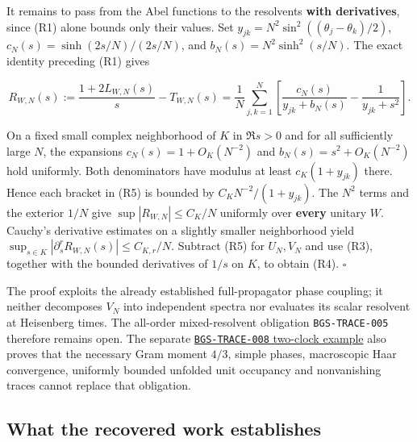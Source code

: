 It remains to pass from the Abel functions to the resolvents \textbf{with
derivatives}, since (R1) alone bounds only their values. Set
\(y_{jk}=N^2\sin^2((\theta_j-\theta_k)/2)\),
\(c_N(s)=\sinh(2s/N)/(2s/N)\), and
\(b_N(s)=N^2\sinh^2(s/N)\). The exact identity preceding (R1) gives

\[
R_{W,N}(s):=\frac{1+2L_{W,N}(s)}s-T_{W,N}(s)
=\frac1N\sum_{j,k=1}^N\left[
 \frac{c_N(s)}{y_{jk}+b_N(s)}-\frac1{y_{jk}+s^2}\right]. \tag{R5}
\]

On a fixed small complex neighborhood of \(K\) in \(\Re s>0\) and for all
sufficiently large \(N\), the expansions
\(c_N(s)=1+O_K(N^{-2})\) and \(b_N(s)=s^2+O_K(N^{-2})\)
hold uniformly. Both denominators have modulus at least
\(c_K(1+y_{jk})\) there. Hence each bracket in (R5) is bounded by
\(C_KN^{-2}/(1+y_{jk})\). The \(N^2\) terms and the exterior \(1/N\)
give \(\sup |R_{W,N}|\le C_K/N\) uniformly over \textbf{every} unitary \(W\).
Cauchy's derivative estimates on a slightly smaller neighborhood yield
\(\sup_{s\in K}|\partial_s^rR_{W,N}(s)|\le C_{K,r}/N\).
Subtract (R5) for \(U_N,V_N\) and use (R3), together with the bounded
derivatives of \(1/s\) on \(K\), to obtain (R4). \(\square\)

The proof exploits the already established full-propagator phase coupling;
it neither decomposes \(V_N\) into independent spectra nor evaluates
its scalar resolvent at Heisenberg times. The all-order mixed-resolvent
obligation \texttt{BGS-TRACE-005} therefore remains open. The separate
\href{https://github.com/ChurilovMaksim/BGS/blob/main/mathematics/two_clock_gram_falsifier.md}{\texttt{BGS-TRACE-008} two-clock example}
also proves that the necessary Gram moment \(4/3\), simple phases,
macroscopic Haar convergence, uniformly bounded unfolded unit occupancy
and nonvanishing traces cannot replace that obligation.

\hypertarget{what-the-recovered-work-establishes}{%
\subsection{What the recovered work establishes}\label{what-the-recovered-work-establishes}}

